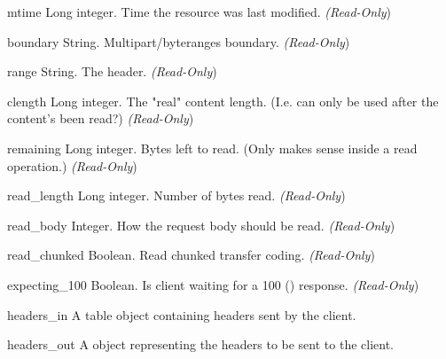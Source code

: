 \begin{memberdesc}[Request]{mtime}
Long integer. Time the resource was last modified.
\emph{(Read-Only})
\end{memberdesc}

\begin{memberdesc}[Request]{boundary}
String. Multipart/byteranges boundary.
\emph{(Read-Only})
\end{memberdesc}

\begin{memberdesc}[Request]{range}
String. The  header.
\emph{(Read-Only})
\end{memberdesc}

\begin{memberdesc}[Request]{clength}
Long integer. The "real" content length. (I.e. can only be used after
the content's been read?)
\emph{(Read-Only})
\end{memberdesc}

\begin{memberdesc}[Request]{remaining}
Long integer. Bytes left to read. (Only makes sense inside a read
operation.)
\emph{(Read-Only})
\end{memberdesc}

\begin{memberdesc}[Request]{read_length}
Long integer. Number of bytes read.
\emph{(Read-Only})
\end{memberdesc}

\begin{memberdesc}[Request]{read_body}
Integer. How the request body should be read.
\emph{(Read-Only})
\end{memberdesc}

\begin{memberdesc}[Request]{read_chunked}
Boolean. Read chunked transfer coding.
\emph{(Read-Only})
\end{memberdesc}

\begin{memberdesc}[Request]{expecting_100}
Boolean. Is client waiting for a 100 () response.
\emph{(Read-Only})
\end{memberdesc}

\begin{memberdesc}[Request]{headers_in}
A table object containing headers sent by the client.
\end{memberdesc}

\begin{memberdesc}[Request]{headers_out}
A  object representing the headers to be sent to the
client. 
\end{memberdesc}


